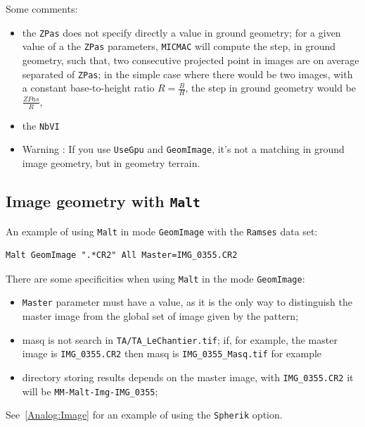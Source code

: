 Some comments:

\begin{itemize}
   \item  the {\tt ZPas} does not specify directly a value in ground geometry;
	 for a given value of a the {\tt ZPas} parameters,  {\tt MICMAC} will compute
	 the step, in ground geometry, such that, two consecutive projected point in images are
	 on average separated of {\tt ZPas};
	 in the simple case where there would be two images, with a constant base-to-height ratio $R=\frac{B}{H}$,
	 the step in ground geometry would be $\frac{ZPas}{R}$,

   \item the {\tt NbVI}   
   \item Warning : If you use {\tt UseGpu} and {\tt GeomImage}, it's not a matching in ground image geometry, but in geometry terrain.
\end{itemize}

\subsection{Image geometry with {\tt Malt}}

An example of using {\tt Malt} in mode {\tt GeomImage}
with the {\tt Ramses} data set:

\begin{verbatim}
Malt GeomImage ".*CR2" All Master=IMG_0355.CR2
\end{verbatim}

There are some specificities when using {\tt Malt} in the mode {\tt GeomImage}:

\begin{itemize}
   \item  {\tt Master} parameter must have a value, as it is the only way to
	  distinguish the master image from the global set of image given by the pattern;
   \item masq is not search in {\tt TA/TA\_LeChantier.tif}; if, for example,
	 the master  image is {\tt IMG\_0355.CR2} then masq is {\tt IMG\_0355\_Masq.tif}
	 for example
   \item directory storing results depends on the master image, with {\tt IMG\_0355.CR2}
	 it will be  {\tt MM-Malt-Img-IMG\_0355};

\end{itemize}


See~\ref{Analog:Image} for an example of using the {\tt Spherik} option.





